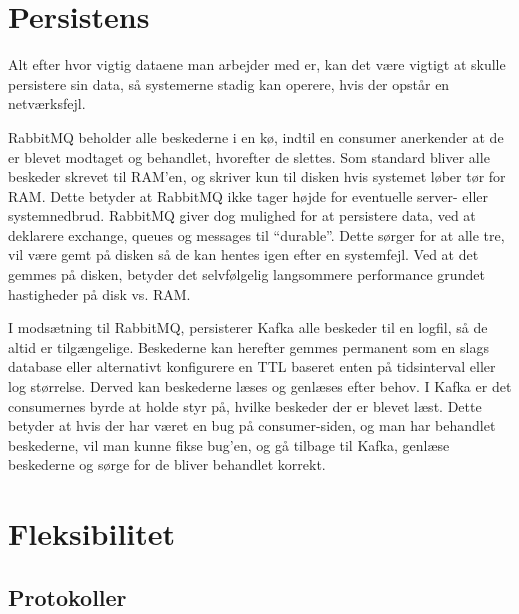 \documentclass[
]{article}
\begin{document}
\hypertarget{persistens}{%
\section{Persistens}\label{persistens}}

Alt efter hvor vigtig dataene man arbejder med er, kan det være vigtigt
at skulle persistere sin data, så systemerne stadig kan operere, hvis
der opstår en netværksfejl.


RabbitMQ beholder alle beskederne i en kø, indtil en consumer anerkender
at de er blevet modtaget og behandlet, hvorefter de slettes. Som
standard bliver alle beskeder skrevet til RAM'en, og skriver kun til
disken hvis systemet løber tør for RAM. Dette betyder at RabbitMQ
ikke tager højde for eventuelle server- eller systemnedbrud.\cite{rabbit-persistence} RabbitMQ giver dog mulighed for at persistere data, ved at deklarere exchange,
queues og messages til ``durable''.\cite{rabbit-durable} Dette sørger for at alle tre, vil
være gemt på disken så de kan hentes igen efter en systemfejl. Ved at
det gemmes på disken, betyder det selvfølgelig langsommere performance
grundet hastigheder på disk vs. RAM.

I modsætning til RabbitMQ, persisterer Kafka alle beskeder til en
logfil, så de altid er tilgængelige. Beskederne kan herefter gemmes
permanent som en slags database eller alternativt konfigurere en TTL
baseret enten på tidsinterval eller log størrelse. Derved kan beskederne
læses og genlæses efter behov. I Kafka er det consumernes byrde at holde
styr på, hvilke beskeder der er blevet læst. Dette betyder at hvis der
har været en bug på consumer-siden, og man har behandlet beskederne, vil
man kunne fikse bug'en, og gå tilbage til Kafka, genlæse beskederne og
sørge for de bliver behandlet korrekt.

\hypertarget{fleksibilitet}{%
\section{Fleksibilitet}\label{fleksibilitet}}

\hypertarget{section}{%
\subsection{}\label{section}}

\hypertarget{protokoller}{%
\subsection{Protokoller}\label{protokoller}}
\end{document}
